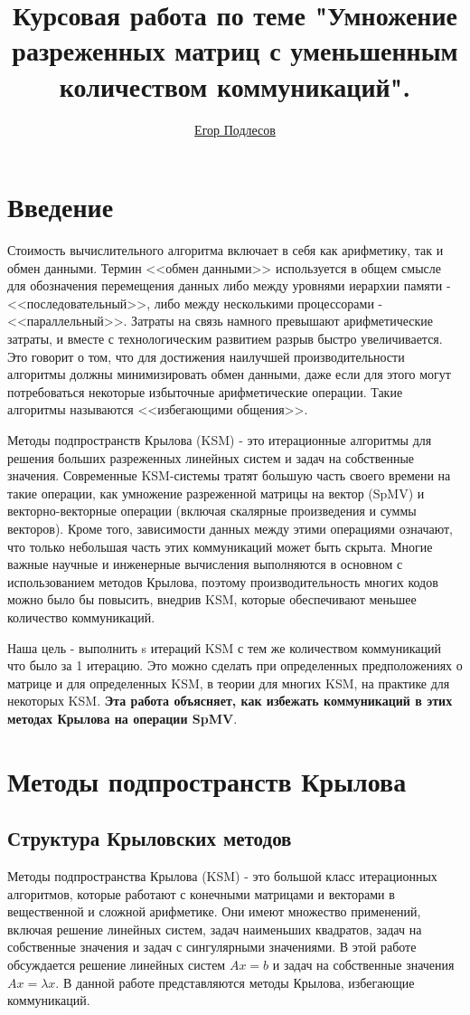 \documentclass[a4paper,12pt]{report}
\author{\href{https://github.com/ypodlesov}{Егор Подлесов}}
\title{\textbf{Курсовая работа по теме "Умножение разреженных матриц с уменьшенным количеством коммуникаций".}}
\begin{document}
    \maketitle
    \clearpage
    \tableofcontents

    \chapter{ Введение }

    Стоимость вычислительного алгоритма включает в себя как арифметику, так и обмен данными. Термин <<обмен данными>> используется в общем смысле для обозначения перемещения данных либо между уровнями иерархии памяти - <<последовательный>>, либо между несколькими процессорами - <<параллельный>>. Затраты на связь намного превышают арифметические затраты, и вместе с технологическим развитием разрыв быстро увеличивается. Это говорит о том, что для достижения наилучшей производительности алгоритмы должны минимизировать обмен данными, даже если для этого могут потребоваться некоторые избыточные арифметические операции. Такие алгоритмы называются <<избегающими общения>>.

    Методы подпространств Крылова (KSM) - это итерационные алгоритмы для решения больших разреженных линейных систем и задач на собственные значения. Современные KSM-системы тратят большую часть своего времени на такие операции, как умножение разреженной матрицы на вектор (SpMV) и векторно-векторные операции (включая скалярные произведения и суммы векторов). Кроме того, зависимости данных между этими операциями означают, что только небольшая часть этих коммуникаций может быть скрыта. Многие важные научные и инженерные вычисления выполняются в основном с использованием методов Крылова, поэтому производительность многих кодов можно было бы повысить, внедрив KSM, которые обеспечивают меньшее количество коммуникаций.

    Наша цель - выполнить s итераций KSM с тем же количеством коммуникаций что было за 1 итерацию. Это можно сделать при определенных предположениях о матрице и для определенных KSM, в теории для многих KSM, на практике для некоторых KSM. \textbf{Эта работа объясняет, как избежать коммуникаций в этих методах Крылова на операции SpMV}.

    \chapter{ Методы подпространств Крылова }
    
    \section{ Структура Крыловских методов }
    Методы подпространства Крылова (KSM) - это большой класс итерационных алгоритмов, которые работают с конечными матрицами и векторами в вещественной и сложной арифметике. Они имеют множество применений, включая решение линейных систем, задач наименьших квадратов, задач на собственные значения и задач с сингулярными значениями. В этой работе обсуждается решение линейных систем $Ax = b$ и задач на собственные значения $Ax = \lambda x$. В данной работе представляются методы Крылова, избегающие коммуникаций.
\end{document}
